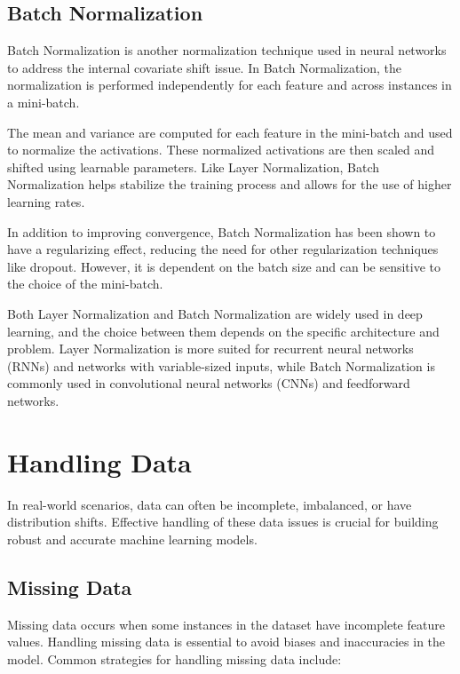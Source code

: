 \documentclass[12pt]{article}
\begin{document}
\subsection{Batch Normalization}
Batch Normalization is another normalization technique used in neural networks to address the internal covariate shift issue. In Batch Normalization, the normalization is performed independently for each feature and across instances in a mini-batch.

The mean and variance are computed for each feature in the mini-batch and used to normalize the activations. These normalized activations are then scaled and shifted using learnable parameters. Like Layer Normalization, Batch Normalization helps stabilize the training process and allows for the use of higher learning rates.

In addition to improving convergence, Batch Normalization has been shown to have a regularizing effect, reducing the need for other regularization techniques like dropout. However, it is dependent on the batch size and can be sensitive to the choice of the mini-batch.

Both Layer Normalization and Batch Normalization are widely used in deep learning, and the choice between them depends on the specific architecture and problem. Layer Normalization is more suited for recurrent neural networks (RNNs) and networks with variable-sized inputs, while Batch Normalization is commonly used in convolutional neural networks (CNNs) and feedforward networks.

\section{Handling Data}

In real-world scenarios, data can often be incomplete, imbalanced, or have distribution shifts. Effective handling of these data issues is crucial for building robust and accurate machine learning models.

\subsection{Missing Data}

Missing data occurs when some instances in the dataset have incomplete feature values. Handling missing data is essential to avoid biases and inaccuracies in the model. Common strategies for handling missing data include:
\end{document}
